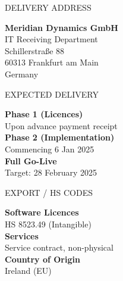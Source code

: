 \documentclass[11pt,a4paper]{article}
\newcommand{\labeltext}[1]{\textcolor{TextLight}{\footnotesize\MakeUppercase{#1}}}
\begin{document}
\noindent
\begin{minipage}[t]{0.31\linewidth}
  \begin{tcolorbox}[infopanel]
    \labeltext{Delivery Address}
    \par\vspace{4pt}
    {\small\bfseries\color{NexaNavy}Meridian Dynamics GmbH}\\
    {\small\color{TextMid}IT Receiving Department}\\
    {\small\color{TextMid}Schillerstra{\ss}e 88}\\
    {\small\color{TextMid}60313 Frankfurt am Main}\\
    {\small\color{TextMid}Germany}
  \end{tcolorbox}
\end{minipage}%
\hfill
\begin{minipage}[t]{0.31\linewidth}
  \begin{tcolorbox}[infopanel]
    \labeltext{Expected Delivery}
    \par\vspace{4pt}
    {\small\bfseries\color{NexaNavy}Phase 1 (Licences)}\\
    {\small\color{TextMid}Upon advance payment receipt}\\[4pt]
    {\small\bfseries\color{NexaNavy}Phase 2 (Implementation)}\\
    {\small\color{TextMid}Commencing 6 Jan 2025}\\[4pt]
    {\small\bfseries\color{NexaNavy}Full Go-Live}\\
    {\small\color{TextMid}Target: 28 February 2025}
  \end{tcolorbox}
\end{minipage}%
\hfill
\begin{minipage}[t]{0.31\linewidth}
  \begin{tcolorbox}[infopanel]
    \labeltext{Export / HS Codes}
    \par\vspace{4pt}
    {\small\bfseries\color{NexaNavy}Software Licences}\\
    {\small\color{TextMid}HS 8523.49 (Intangible)}\\[4pt]
    {\small\bfseries\color{NexaNavy}Services}\\
    {\small\color{TextMid}Service contract, non-physical}\\[4pt]
    {\small\bfseries\color{NexaNavy}Country of Origin}\\
    {\small\color{TextMid}Ireland (EU)}
  \end{tcolorbox}
\end{minipage}
\end{document}
